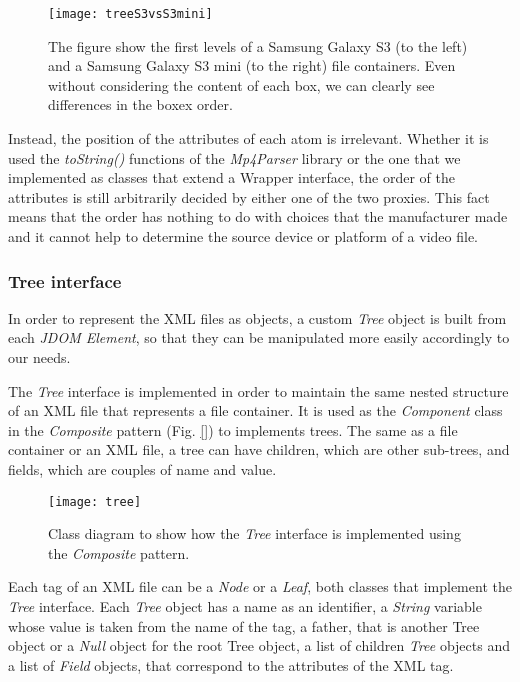 \begin{figure}
  \centering
  \texttt{[image: treeS3vsS3mini]}
  \caption{The figure show the first levels of a Samsung Galaxy S3 (to the left) and a Samsung Galaxy S3 mini (to the right) file containers. Even without considering the content of each box, we can clearly see differences in the boxex order.}\label{fig:treeS3vsS3mini}
\end{figure}

Instead, the position of the attributes of each atom is irrelevant. Whether it is used the \emph{toString()} functions of the \emph{Mp4Parser} library or the one that we implemented as classes that extend a Wrapper interface, the order of the attributes is still arbitrarily decided by either one of the two proxies. This fact means that the order has nothing to do with choices that the manufacturer made and it cannot help to determine the source device or platform of a video file.

\subsubsection*{Tree interface}

In order to represent the XML files as objects, a custom \emph{Tree} object is built from each \emph{JDOM Element}, so that they can be manipulated more easily accordingly to our needs.

The \emph{Tree} interface is implemented in order to maintain the same nested structure of an XML file that represents a file container. It is used as the \emph{Component} class in the \emph{Composite} pattern (Fig. \ref{}) to implements trees. The same as a file container or an XML file, a tree can have children, which are other sub-trees, and fields, which are couples of name and value.

\begin{figure}
  \centering
  \texttt{[image: tree]}
  \caption{Class diagram to show how the \emph{Tree} interface is implemented using the \emph{Composite} pattern.}\label{fig:tree}
\end{figure}

Each tag of an XML file can be a \emph{Node} or a \emph{Leaf}, both classes that implement the \emph{Tree} interface. Each \emph{Tree} object has a name as an identifier, a \emph{String} variable whose value is taken from the name of the tag, a father, that is another Tree object or a \emph{Null} object for the root Tree object, a list of children \emph{Tree} objects and a list of \emph{Field} objects, that correspond to the attributes of the XML tag.

